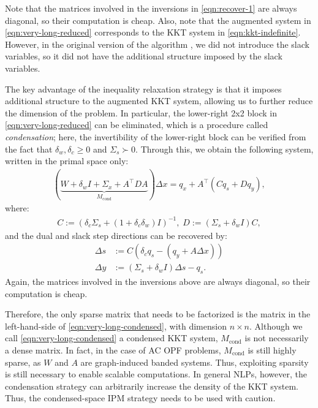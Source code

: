 Note that the matrices involved in the inversions in \eqref{eqn:recover-1}
are always diagonal, so their computation is cheap.
Also, note that the augmented system in \eqref{eqn:very-long-reduced}
corresponds to the KKT system in \eqref{eqn:kkt-indefinite}. However,
in the original version of the algorithm \cite{pacaud2023accelerating}, we did not introduce the
slack variables, so it did not have the additional structure imposed
by the slack variables.

The key advantage of the inequality relaxation strategy is that it
imposes additional structure to the augmented KKT system, allowing us to
further reduce the dimension of the problem. In particular, the
lower-right 2x2 block in \eqref{eqn:very-long-reduced} can be
eliminated, which is a procedure called {\it condensation}; here, the invertibility of the lower-right block can be verified from the fact that $\delta_w,\delta_c\geq 0$ and $\Sigma_s\succ 0$. Through this,
we obtain the following system, written in the  primal
space only:
\begin{align}\label{eqn:very-long-condensed}
  (\underbrace{W + \delta_wI + \Sigma_x + A^{\top} D A}_{M_\text{cond}} ) \Delta x = q_x + A^\top (C q_s +  Dq_y ),
\end{align}
where:
\begin{align*}
  C := \left(\delta_c \Sigma_s + (1+\delta^{}_c\delta^{}_w) I\right)^{-1}, \;
  D := \left(\Sigma_s + \delta^{}_w I\right)C,
\end{align*}
and the dual and slack step directions can be recovered by:
\begin{align}
  \Delta s &:= C \left(\delta_c q_s - (q_y + A\Delta x)\right)\nonumber\\
  \Delta y &:= (\Sigma_s + \delta_w I) \Delta s -q_s.\label{eqn:recover-2}
\end{align}
Again, the matrices involved in the inversions above are always
diagonal, so their computation is cheap.

Therefore, the only sparse matrix that needs to be factorized is the
matrix in the left-hand-side of \eqref{eqn:very-long-condensed}, with
dimension $n \times n$.  Although we call
\eqref{eqn:very-long-condensed} a condensed KKT system,
$M_\text{cond}$ is not necessarily a dense matrix. In fact, in the
case of AC OPF problems, $M_\text{cond}$ is still highly sparse, as
$W$ and $A$ are graph-induced banded systems.  Thus, exploiting
sparsity is still necessary to enable scalable computations.  In
general NLPs, however, the condensation strategy can arbitrarily
increase the density of the KKT system. Thus, the condensed-space IPM
strategy needs to be used with caution.

